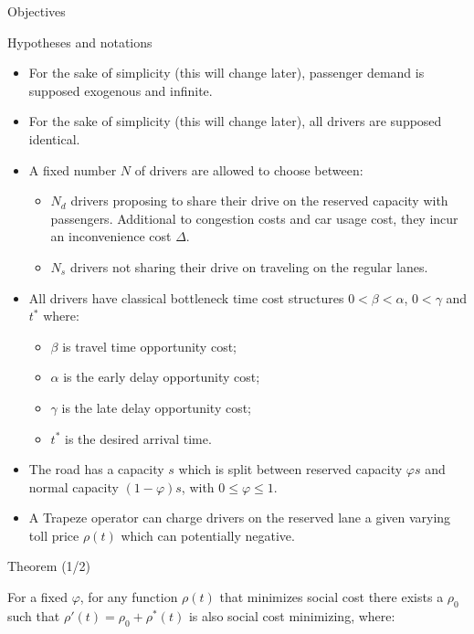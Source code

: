 \documentclass[final, english]{beamer}
\newlength{\twocolwid}
\begin{document}
\begin{frame}[t]
\begin{columns}[t]
\begin{column}{\twocolwid}
\begin{alertblock}{Objectives}
\end{alertblock}

\begin{block}{Hypotheses and notations}
    \begin{itemize}
        \item For the sake of simplicity (this will change later), passenger demand is supposed exogenous and infinite.
        \item For the sake of simplicity (this will change later), all drivers are supposed identical.
        \item A fixed number $N$ of drivers are allowed to choose between:
        \begin{itemize}
            \item $N_d$ drivers proposing to share their drive on the reserved capacity with passengers. Additional to congestion costs and car usage cost, they incur an inconvenience cost $\Delta$.
            \item $N_s$ drivers not sharing their drive on traveling on the regular lanes.
        \end{itemize}
        \item All drivers have classical bottleneck time cost structures $0 < \beta < \alpha$, $0 < \gamma$ and $t^*$ where:
        \begin{itemize}
            \item $\beta$ is travel time opportunity cost;
            \item $\alpha$ is the early delay opportunity cost;
            \item $\gamma$ is the late delay opportunity cost;
            \item $t^*$ is the desired arrival time.
        \end{itemize}
        \item The road has a capacity $s$ which is split between reserved capacity $\varphi s$ and normal capacity $( 1-\varphi ) s$, with $0 \leq \varphi \leq 1$.
        \item A Trapeze operator can charge drivers on the reserved lane a given varying toll price $\rho (t)$ which can potentially negative.
    \end{itemize}
\end{block}

\begin{alertblock}{Theorem (1/2)}

    For a fixed $\varphi$, for any function $\rho (t)$ that minimizes social cost there exists a $\rho_0$ such that $\rho ' (t) = \rho_0 + \rho^*(t)$ is also social cost minimizing, where:


\end{alertblock}
\end{column}
\end{columns}
\end{frame}
\end{document}
